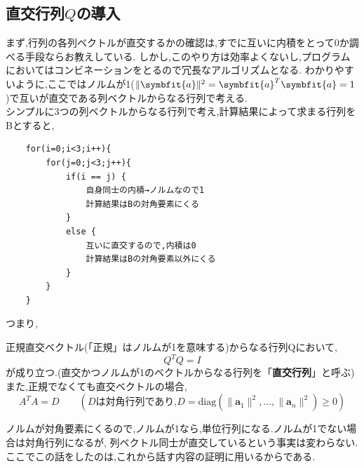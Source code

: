 \subsection{直交行列$Q$の導入}
まず,行列の各列ベクトルが直交するかの確認は,すでに互いに内積をとって0か調べる手段ならお教えしている.
しかし,このやり方は効率よくないし,プログラムにおいてはコンビネーションをとるので冗長なアルゴリズムとなる.
わかりやすいように,ここではノルムが1($\|\symbfit{a}\|^2=\symbfit{a}^T\symbfit{a}=1$)で互いが直交である列ベクトルからなる行列で考える.\\
シンプルに3つの列ベクトルからなる行列で考え,計算結果によって求まる行列をBとすると,
\begin{verbatim}
    for(i=0;i<3;i++){
        for(j=0;j<3;j++){
            if(i == j) {
                自身同士の内積→ノルムなので1
                計算結果はBの対角要素にくる
            }
            else {
                互いに直交するので,内積は0
                計算結果はBの対角要素以外にくる
            }
        }
    }
\end{verbatim}
つまり,
\begin{tcolorbox}[colframe=black!80,colback=white,title=出力する行列が対角行列である意味]
正規直交ベクトル(「正規」はノルムが1を意味する)からなる行列Qにおいて,
\[
Q^TQ=I\]
が成り立つ.(直交かつノルムが1のベクトルからなる行列を「\textbf{直交行列}」と呼ぶ)\\
また,正規でなくても直交ベクトルの場合,
\[
A^T A=D \qquad(Dは\text{対角行列であり,}D=\mathrm{diag}(\|\mathbf a_1\|^2,\dots,\|\mathbf a_n\|^2)\geq 0)\]
\end{tcolorbox}
\noindent
ノルムが対角要素にくるので,ノルムが1なら,単位行列になる.ノルムが1でない場合は対角行列になるが,
列ベクトル同士が直交しているという事実は変わらない.\\
ここでこの話をしたのは,これから話す内容の証明に用いるからである.
